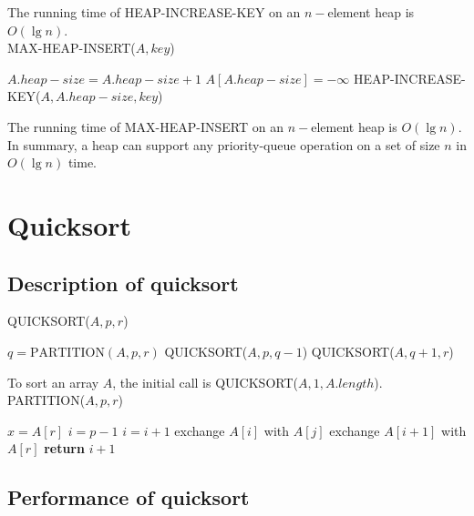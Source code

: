 \documentclass[12pt]{article}
\begin{document}
The running time of HEAP-INCREASE-KEY on an $n-$element heap is $O(\lg n)$. \\

MAX-HEAP-INSERT($A, key$)
\begin{algorithmic}[1]
\State $A.heap-size = A.heap-size + 1$
\State $A[A.heap-size] = -\infty$
\State HEAP-INCREASE-KEY($A, A.heap-size,key$)
\end{algorithmic}

The running time of MAX-HEAP-INSERT on an $n-$element heap is $O(\lg n)$. \\

In summary, a heap can support any priority-queue operation on a set of size $n$ in $O(\lg n)$ time.

\section{Quicksort}

\subsection{Description of quicksort}

QUICKSORT($A, p, r$)
\begin{algorithmic}[1]
	\State $q = \text {PARTITION}(A, p, r)$
        \State QUICKSORT($A, p, q-1$)
        \State QUICKSORT($A, q+1, r$)
\EndIf
\end{algorithmic}

To sort an array $A$, the initial call is QUICKSORT($A, 1, A.length$). \\

PARTITION($A, p, r$)
\begin{algorithmic}[1]
\State $x = A[r]$
\State $i = p - 1$
        	\State $i = i + 1$
                \State exchange $A[i]$ with $A[j]$
        \EndIf
\EndFor
\State exchange $A[i+1]$ with $A[r]$
\State \textbf{return } $i+1$
\end{algorithmic}

\subsection{Performance of quicksort}
\end{document}
